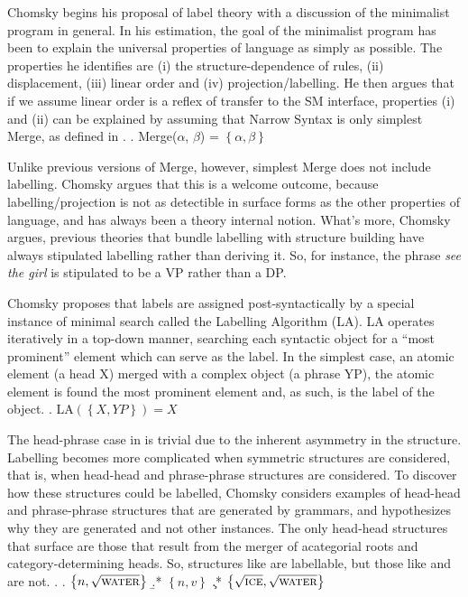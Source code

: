 \documentclass[MilwayThesis]{subfiles}
\begin{document}
Chomsky begins his proposal of label theory with a discussion of the minimalist program in general.
In his estimation, the goal of the minimalist program has been to explain the universal properties of language as simply as possible.
The properties he identifies are (i) the structure-dependence of rules, (ii) displacement, (iii) linear order and (iv) projection/labelling.
He then argues that if we assume linear order is a reflex of transfer to the SM interface, properties (i) and (ii) can be explained by assuming that Narrow Syntax is only simplest Merge, as defined in \Next.
\ex. Merge($\alpha$, $\beta$) = $\left\{ \alpha, \beta \right\}$

Unlike previous versions of Merge, however, simplest Merge does not include labelling.
Chomsky argues that this is a welcome outcome, because labelling/projection is not as detectible in surface forms as the other properties of language, and has always been a theory internal notion.
What's more, Chomsky argues, previous theories that bundle labelling with structure building have always stipulated labelling rather than deriving it.
So, for instance, the phrase \textit{see the girl} is stipulated to be a VP rather than a DP.

Chomsky proposes that labels are assigned post-syntactically by a special instance of minimal search called the Labelling Algorithm (LA).
LA operates iteratively in a top-down manner, searching each syntactic object for a ``most prominent'' element which can serve as the label.
In the simplest case, an atomic element (a head X) merged with a complex object (a phrase YP), the atomic element is found the most prominent element and, as such, is the label of the object.
\ex. LA$(\left\{ X, YP \right\}) = X$

The head-phrase case in \Last is trivial due to the inherent asymmetry in the structure.
Labelling becomes more complicated when symmetric structures are considered, that is, when head-head and phrase-phrase structures are considered.
To discover how these structures could be labelled, Chomsky considers examples of head-head and phrase-phrase structures that are generated by grammars, and hypothesizes why they are generated and not other instances.
The only head-head structures that surface are those that result from the merger of acategorial roots and category-determining heads.
So, structures like \Next[a] are labellable, but those like \Next[b] and \Next[c] are not.
\ex.
\a. $\left\{ n, \sqrt{\textsc{water}}\right\}$
\b.* $\left\{ n, v\right\}$
\c.* $\left\{ \sqrt{\textsc{ice}}, \sqrt{\textsc{water}} \right\}$
\end{document}
